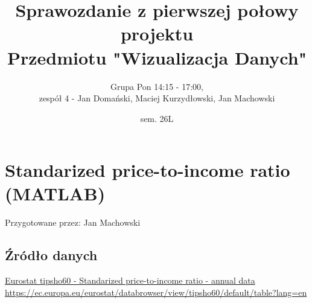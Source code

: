 \documentclass[12pt]{article}
\title{Sprawozdanie z pierwszej połowy projektu\\
Przedmiotu "Wizualizacja Danych"}
\author{Grupa Pon 14:15 - 17:00, \\zespół 4 - Jan Domański, Maciej Kurzydłowski, Jan Machowski}
\date{sem. 26L}
\begin{document}
\maketitle
\tableofcontents
\newpage





\section{Standarized price-to-income ratio (MATLAB)}

Przygotowane przez: Jan Machowski

\subsection{Źródło danych}
\href{https://ec.europa.eu/eurostat/databrowser/view/tipsho60/default/table?lang=en}{Eurostat tipsho60 - Standarized price-to-income ratio - annual data}\\
\url{https://ec.europa.eu/eurostat/databrowser/view/tipsho60/default/table?lang=en}
\end{document}
